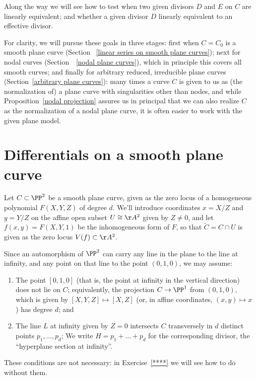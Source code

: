 Along the way we will see how to test when two given divisors $D$ and $E$ on $C$ are linearly equivalent; and whether a given divisor $D$ linearly equivalent to an effective divisor.

For clarity, we will pursue these goals in three stages: first when $C = C_0$ is a smooth plane curve (Section~ \ref{linear series on smooth plane curves}); next for nodal curves (Section~~\ref{nodal plane curves}), which in principle this covers all smooth curves; and finally for arbitrary reduced, irreducible plane curves (Section~\ref{arbitrary plane curves}): many times a curve $C$ is given to us as (the normalization of) a plane curve with singularities other than nodes, and while Proposition~\ref{nodal projection} assures us in principal that we can also realize $C$ as the normalization of a nodal plane curve, it is often easier to work with the given plane model. 

\section{Differentials on a smooth plane curve}\label{canonical series on smooth plane curves}

Let $C \subset \PP^2$  be a smooth plane curve, given as the zero locus of a homogeneous polynomial $F(X,Y,Z)$ of degree $d$. We'll introduce coordinates $x = X/Z$ and $y = Y/Z$ on the affine open subset $U \cong \AA^2$ given by $Z \neq 0$, and let $f(x,y) = F(X,Y,1)$ be the inhomogeneous form of $F$, so that $\widetilde C = C \cap U$ is given as the zero locus $V(f) \subset  \AA^2$. 

Since an automorphism of $\PP^2$ can carry any line in the plane to the line at infinity, and any point on that line to the point $(0,1,0)$, we may assume:
\begin{enumerate}
\item The point $[0,1,0]$ (that is, the point at infinity in the vertical direction) does not lie on $C$; equivalently,  the projection $C \to \PP^1$ from $(0,1,0)$, which is given by $[X,Y,Z] \mapsto [X,Z]$ (or, in affine coordinates, $(x,y) \mapsto x$)  has degree $d$; and
\item The line $L$ at infinity given by $Z = 0$ intersects $C$ transversely in $d$ distinct points $p_1, \dots, p_d$; We write $H = p_1+ \dots +p_d$ for the corresponding divisor, the ``hyperplane section at infinity''.
\end{enumerate}

These conditions are not necessary: in Exercise~\ref{****} we will see how to do  without them.
 
